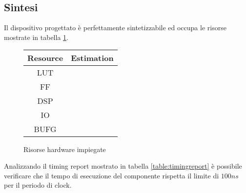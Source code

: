 \subsection{Sintesi}

Il dispositivo progettato è perfettamente sintetizzabile ed occupa le risorse mostrate in tabella \ref{table:risorse}.

\begin{figure}[!ht]
    \centering
    \begin{tabular}{|c | c |}
        \hline
        Resource & Estimation \\
        \hline
        LUT      &            \\
        \hline
        FF       &            \\
        \hline
        DSP      &            \\
        \hline
        IO       &            \\
        \hline
        BUFG     &            \\
        \hline
    \end{tabular}
    \caption{Risorse hardware impiegate}
    \label{table:risorse}
\end{figure}

Analizzando il timing report mostrato in tabella \ref{table:timingreport} è possibile verificare che il tempo di esecuzione del componente rispetta il limite di $100ns$ per il periodo di clock.


